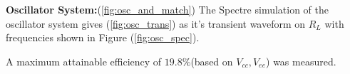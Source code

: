 \textbf{Oscillator System:}(\ref{fig:osc_and_match}) The Spectre simulation of the oscillator system gives (\ref{fig:osc_trans}) as it's transient waveform on \(R_L\) with frequencies shown in Figure (\ref{fig:osc_spec}). 

A maximum attainable efficiency of \(19.8\%\)(based on \(V_{cc}, V_{ee}\)) was measured.

